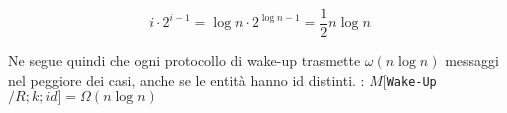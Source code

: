 $$i \cdot 2^{i-1} = \log n \cdot 2^{\log n-1} = {\frac{1}{2}} n \log n$$

Ne segue quindi che ogni protocollo di wake-up trasmette $\omega(n \log n)$
messaggi nel peggiore dei casi, anche se le entità hanno id distinti. :
$M[$\texttt{Wake-Up}$/R;k;id] = \Omega(n \log n)$





